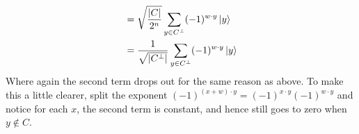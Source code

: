 \documentclass[boxes,pages]{homework}
\begin{document}
\begin{solution}
\begin{align*}
		                                                                    & = \sqrt{\frac{\abs{C}}{2^n}}\sum_{y\in C^\perp}(-1)^{w\cdot y}\ket{y}                                       \\
		                                                                    & = \frac{1}{\sqrt{\abs{C^\perp}}}\sum_{y\in C^\perp}(-1)^{w\cdot y}\ket{y}
	\end{align*}
	Where again the second term drops out for the same reason as above. To make this a little clearer, split the exponent $(-1)^{(x+w)\cdot y} = (-1)^{x\cdot y}(-1)^{w\cdot y}$ and notice for each $x$, the second term is constant, and hence still goes to zero when $y\notin C$.
\end{solution}
\end{document}
